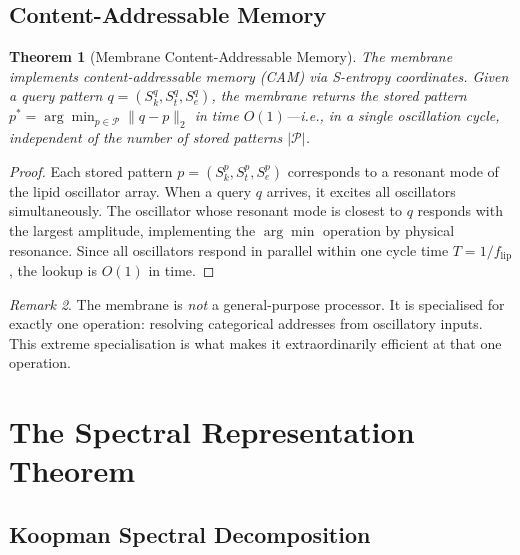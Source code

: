 \documentclass[11pt,twocolumn,a4paper]{article}
\newtheorem{theorem}{Theorem}[section]
\theoremstyle{definition}
\theoremstyle{remark}
\newtheorem{remark}[theorem]{Remark}
\newcommand{\Sk}{S_{k}}
\newcommand{\St}{S_{t}}
\newcommand{\Se}{S_{e}}
\begin{document}
\subsection{Content-Addressable Memory}

\begin{theorem}[Membrane Content-Addressable Memory]\label{thm:CAM}
The membrane implements content-addressable memory (CAM) via S-entropy coordinates.  Given a query pattern $q = (\Sk^q, \St^q, \Se^q)$, the membrane returns the stored pattern $p^* = \arg\min_{p \in \mathcal{P}} \|q - p\|_2$ in time $O(1)$---i.e., in a single oscillation cycle, independent of the number of stored patterns $|\mathcal{P}|$.
\end{theorem}

\begin{proof}
Each stored pattern $p = (\Sk^p, \St^p, \Se^p)$ corresponds to a resonant mode of the lipid oscillator array.  When a query $q$ arrives, it excites all oscillators simultaneously.  The oscillator whose resonant mode is closest to $q$ responds with the largest amplitude, implementing the $\arg\min$ operation by physical resonance.  Since all oscillators respond in parallel within one cycle time $T = 1/f_{\mathrm{lip}}$, the lookup is $O(1)$ in time.
\end{proof}

\begin{remark}
The membrane is \emph{not} a general-purpose processor.  It is specialised for exactly one operation: resolving categorical addresses from oscillatory inputs.  This extreme specialisation is what makes it extraordinarily efficient at that one operation.
\end{remark}




\section{The Spectral Representation Theorem}\label{sec:spectral-representation}

\subsection{Koopman Spectral Decomposition}
\end{document}
